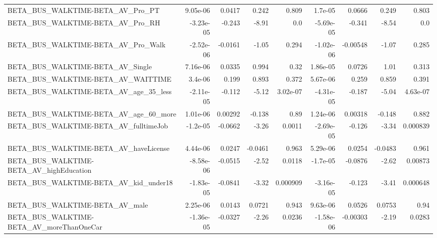 \begin{tabular}{lrrrrrrrr}
BETA\_BUS\_WALKTIME-BETA\_AV\_Pro\_PT                   &    9.05e-06 &       0.0417 &     0.242 &    0.809 &    1.7e-05 &      0.0666 &        0.249 &         0.803 \\
BETA\_BUS\_WALKTIME-BETA\_AV\_Pro\_RH                   &   -3.23e-05 &       -0.243 &     -8.91 &      0.0 &  -5.69e-05 &      -0.341 &        -8.54 &           0.0 \\
BETA\_BUS\_WALKTIME-BETA\_AV\_Pro\_Walk                 &   -2.52e-06 &      -0.0161 &     -1.05 &    0.294 &  -1.02e-06 &    -0.00548 &        -1.07 &         0.285 \\
BETA\_BUS\_WALKTIME-BETA\_AV\_Single                   &    7.16e-06 &       0.0335 &     0.994 &     0.32 &   1.86e-05 &      0.0726 &         1.01 &         0.313 \\
BETA\_BUS\_WALKTIME-BETA\_AV\_WAITTIME                 &     3.4e-06 &        0.199 &     0.893 &    0.372 &   5.67e-06 &       0.259 &        0.859 &         0.391 \\
BETA\_BUS\_WALKTIME-BETA\_AV\_age\_35\_less              &   -2.11e-05 &       -0.112 &     -5.12 & 3.02e-07 &  -4.31e-05 &      -0.187 &        -5.04 &      4.63e-07 \\
BETA\_BUS\_WALKTIME-BETA\_AV\_age\_60\_more              &    1.01e-06 &      0.00292 &    -0.138 &     0.89 &   1.24e-06 &     0.00318 &       -0.148 &         0.882 \\
BETA\_BUS\_WALKTIME-BETA\_AV\_fulltimeJob              &    -1.2e-05 &      -0.0662 &     -3.26 &   0.0011 &  -2.69e-05 &      -0.126 &        -3.34 &      0.000839 \\
BETA\_BUS\_WALKTIME-BETA\_AV\_haveLicense              &    4.44e-06 &       0.0247 &   -0.0461 &    0.963 &   5.29e-06 &      0.0254 &      -0.0483 &         0.961 \\
BETA\_BUS\_WALKTIME-BETA\_AV\_highEducation            &   -8.58e-06 &      -0.0515 &     -2.52 &   0.0118 &   -1.7e-05 &     -0.0876 &        -2.62 &       0.00873 \\
BETA\_BUS\_WALKTIME-BETA\_AV\_kid\_under18              &   -1.83e-05 &      -0.0841 &     -3.32 & 0.000909 &  -3.16e-05 &      -0.123 &        -3.41 &      0.000648 \\
BETA\_BUS\_WALKTIME-BETA\_AV\_male                     &    2.25e-06 &       0.0143 &    0.0721 &    0.943 &   9.63e-06 &      0.0526 &       0.0753 &          0.94 \\
BETA\_BUS\_WALKTIME-BETA\_AV\_moreThanOneCar           &   -1.36e-05 &      -0.0327 &     -2.26 &   0.0236 &  -1.58e-06 &    -0.00303 &        -2.19 &        0.0283 \\

\end{tabular}
